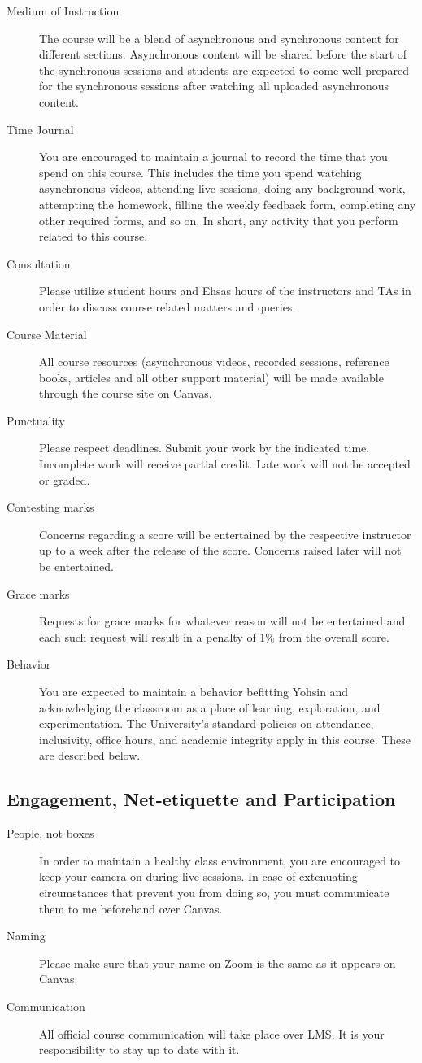 \documentclass[a4paper]{article}
\begin{document}
\begin{description}
\item[Medium of Instruction] The course will be a blend of asynchronous and synchronous content for different sections. Asynchronous content will be shared before the start of the synchronous sessions and students are expected to come well prepared for the synchronous sessions after watching all uploaded asynchronous content.
\item[Time Journal] You are encouraged to maintain a journal to record the time that you spend on this course. This includes the time you spend watching asynchronous videos, attending live sessions, doing any background work, attempting the homework, filling the weekly feedback form, completing any other required forms, and so on. In short, any activity that you perform related to this course. 
\item[Consultation] Please utilize student hours and Ehsas hours of the instructors and TAs in order to discuss course related matters and queries.
\item[Course Material] All course resources (asynchronous videos, recorded sessions, reference books, articles and all other support material) will be made available through the course site on Canvas.
\item[Punctuality] Please respect deadlines. Submit your work by the indicated time. Incomplete work will receive partial credit. Late work will not be accepted or graded. 
\item[Contesting marks] Concerns regarding a score will be entertained by the respective instructor up to a week after the release of the score. Concerns raised later will not be entertained. 
\item[Grace marks] Requests for grace marks for whatever reason will not be entertained and each such request will result in a penalty of 1\% from the overall score. 
\item[Behavior] You are expected to maintain a behavior befitting Yohsin and acknowledging the classroom as a place of learning, exploration, and experimentation. The University’s standard policies on attendance, inclusivity, office hours, and academic integrity apply in this course. These are described below. 
\end{description}

\subsection{Engagement, Net-etiquette and Participation}
  \begin{description}
  \item[People, not boxes] In order to maintain a healthy class environment, you are encouraged to keep your camera on during live sessions. In case of extenuating circumstances that prevent you from doing so, you must communicate them to me beforehand over Canvas.
  \item[Naming] Please make sure that your name on Zoom is the same as it appears on Canvas.
  \item[Communication] All official course communication will take place over LMS. It is your responsibility to stay up to date with it. 
  \end{description}
\end{document}
